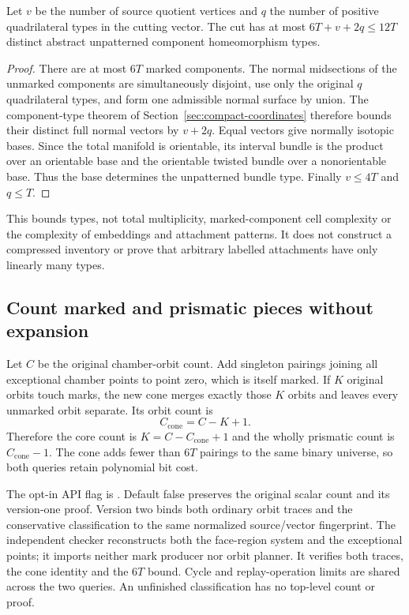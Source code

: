 \begin{corollary}
Let $v$ be the number of source quotient vertices and $q$ the number of
positive quadrilateral types in the cutting vector. The cut has at most
$6T+v+2q\le12T$ distinct abstract unpatterned component homeomorphism types.
\end{corollary}
\begin{proof}
There are at most $6T$ marked components. The normal midsections of the
unmarked components are simultaneously disjoint, use only the original
$q$ quadrilateral types, and form one admissible normal surface by union.
The component-type theorem of Section~\ref{sec:compact-coordinates} therefore
bounds their distinct full normal vectors by $v+2q$. Equal vectors give
normally isotopic bases. Since the total manifold is orientable, its interval
bundle is the product over an orientable base and the orientable twisted
bundle over a nonorientable base. Thus the base determines the unpatterned
bundle type. Finally $v\le4T$ and $q\le T$.
\end{proof}

This bounds types, not total multiplicity, marked-component cell complexity
or the complexity of embeddings and attachment patterns. It does not
construct a compressed inventory or prove that arbitrary labelled
attachments have only linearly many types.

\subsection{Count marked and prismatic pieces without expansion}

Let $C$ be the original chamber-orbit count. Add singleton pairings joining
all exceptional chamber points to point zero, which is itself marked.
If $K$ original orbits touch marks, the new cone merges exactly those $K$
orbits and leaves every unmarked orbit separate. Its orbit count is
\[
                 C_\mathrm{cone}=C-K+1.
\]
Therefore the core count is $K=C-C_\mathrm{cone}+1$ and the wholly prismatic
count is $C_\mathrm{cone}-1$. The cone adds fewer than $6T$ pairings to the
same binary universe, so both queries retain polynomial bit cost.

The opt-in API flag is . Default false preserves the
original scalar count and its version-one proof. Version two binds both
ordinary orbit traces and the conservative classification to the same
normalized source/vector fingerprint. The independent checker reconstructs
both the face-region system and the exceptional points; it imports neither
mark producer nor orbit planner. It verifies both traces, the cone identity
and the $6T$ bound. Cycle and replay-operation limits are shared across the
two queries. An unfinished classification has no top-level count or proof.


